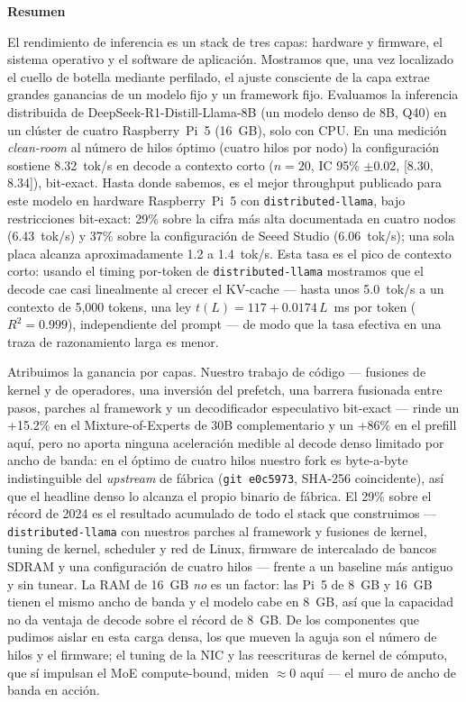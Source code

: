 \documentclass[10pt,a4paper]{article}
\renewenvironment{abstract}{%
  \vspace{2pt}\begin{center}\textbf{Resumen}\end{center}\par\vspace{1pt}%
  \begingroup\small\setlength{\leftskip}{1.8em}\setlength{\rightskip}{1.8em}\noindent\ignorespaces
}{\par\endgroup\vspace{10pt}}
\begin{document}
\begin{abstract}
El rendimiento de inferencia es un stack de tres capas: hardware y firmware, el sistema operativo y el software de aplicación. Mostramos que, una vez localizado el cuello de botella mediante perfilado, el ajuste consciente de la capa extrae grandes ganancias de un modelo fijo y un framework fijo. Evaluamos la inferencia distribuida de DeepSeek-R1-Distill-Llama-8B (un modelo denso de 8B, Q40) en un clúster de cuatro Raspberry~Pi~5 (16~GB), solo con CPU. En una medición \emph{clean-room} al número de hilos óptimo (cuatro hilos por nodo) la configuración sostiene 8.32~tok/s en decode a contexto corto ($n{=}20$, IC 95\% $\pm$0.02, [8.30, 8.34]), bit-exact. Hasta donde sabemos, es el mejor throughput publicado para este modelo en hardware Raspberry~Pi~5 con \texttt{distributed-llama}, bajo restricciones bit-exact: 29\% sobre la cifra más alta documentada en cuatro nodos (6.43~tok/s) y 37\% sobre la configuración de Seeed Studio (6.06~tok/s); una sola placa alcanza aproximadamente 1.2 a 1.4~tok/s. Esta tasa es el pico de contexto corto: usando el timing por-token de \texttt{distributed-llama} mostramos que el decode cae casi linealmente al crecer el KV-cache --- hasta unos 5.0~tok/s a un contexto de 5{,}000 tokens, una ley $t(L){=}117{+}0.0174\,L$~ms por token ($R^2{=}0.999$), independiente del prompt --- de modo que la tasa efectiva en una traza de razonamiento larga es menor.

Atribuimos la ganancia por capas. Nuestro trabajo de código --- fusiones de kernel y de operadores, una inversión del prefetch, una barrera fusionada entre pasos, parches al framework y un decodificador especulativo bit-exact --- rinde un +15.2\% en el Mixture-of-Experts de 30B complementario y un +86\% en el prefill aquí, pero no aporta ninguna aceleración medible al decode denso limitado por ancho de banda: en el óptimo de cuatro hilos nuestro fork es byte-a-byte indistinguible del \emph{upstream} de fábrica (\texttt{git}~\texttt{e0c5973}, SHA-256 coincidente), así que el headline denso lo alcanza el propio binario de fábrica. El 29\% sobre el récord de 2024 es el resultado acumulado de todo el stack que construimos --- \texttt{distributed-llama} con nuestros parches al framework y fusiones de kernel, tuning de kernel, scheduler y red de Linux, firmware de intercalado de bancos SDRAM y una configuración de cuatro hilos --- frente a un baseline más antiguo y sin tunear. La RAM de 16~GB \emph{no} es un factor: las Pi~5 de 8~GB y 16~GB tienen el mismo ancho de banda y el modelo cabe en 8~GB, así que la capacidad no da ventaja de decode sobre el récord de 8~GB. De los componentes que pudimos aislar en esta carga densa, los que mueven la aguja son el número de hilos y el firmware; el tuning de la NIC y las reescrituras de kernel de cómputo, que sí impulsan el MoE compute-bound, miden $\approx$0 aquí --- el muro de ancho de banda en acción.


\end{abstract}
\end{document}
